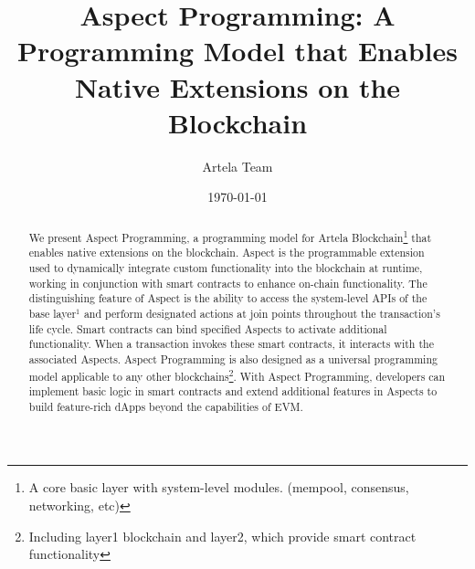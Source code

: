 \documentclass{article}
\begin{document}
\title{Aspect Programming: A Programming Model that Enables Native Extensions on the Blockchain}
\author{Artela Team}
\date{\today}


\maketitle

\begin{abstract}
    We present Aspect Programming, a programming model for Artela Blockchain\footnote{A core basic layer with system-level modules. (mempool, consensus, networking, etc)} that enables native extensions on the blockchain. Aspect is the programmable extension used to dynamically integrate custom functionality into the blockchain at runtime, working in conjunction with smart contracts to enhance on-chain functionality. The distinguishing feature of Aspect is the ability to access the system-level APIs of the base layer$^1$ and perform designated actions at join points throughout the transaction's life cycle. Smart contracts can bind specified Aspects to activate additional functionality. When a transaction invokes these smart contracts, it interacts with the associated Aspects. Aspect Programming is also designed as a universal programming model applicable to any other blockchains\footnote{Including layer1 blockchain and layer2, which provide smart contract functionality}. With Aspect Programming, developers can implement basic logic in smart contracts and extend additional features in Aspects to build feature-rich dApps beyond the capabilities of EVM.
\end{abstract}

\newpage
\tableofcontents
\newpage









\newpage




\end{document}
